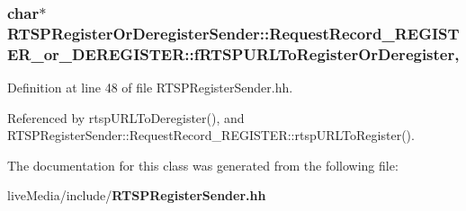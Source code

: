 \subsubsection[{f\+R\+T\+S\+P\+U\+R\+L\+To\+Register\+Or\+Deregister}]{\setlength{\rightskip}{0pt plus 5cm}char$\ast$ R\+T\+S\+P\+Register\+Or\+Deregister\+Sender\+::\+Request\+Record\+\_\+\+R\+E\+G\+I\+S\+T\+E\+R\+\_\+or\+\_\+\+D\+E\+R\+E\+G\+I\+S\+T\+E\+R\+::f\+R\+T\+S\+P\+U\+R\+L\+To\+Register\+Or\+Deregister\hspace{0.3cm}{\ttfamily [protected]}, {\ttfamily [inherited]}}\label{classRTSPRegisterOrDeregisterSender_1_1RequestRecord__REGISTER__or__DEREGISTER_a0f64ba313a2cc03bc1b9f4219ee992c8}


Definition at line 48 of file R\+T\+S\+P\+Register\+Sender.\+hh.



Referenced by rtsp\+U\+R\+L\+To\+Deregister(), and R\+T\+S\+P\+Register\+Sender\+::\+Request\+Record\+\_\+\+R\+E\+G\+I\+S\+T\+E\+R\+::rtsp\+U\+R\+L\+To\+Register().



The documentation for this class was generated from the following file\+:\begin{DoxyCompactItemize}
\item 
live\+Media/include/{\bf R\+T\+S\+P\+Register\+Sender.\+hh}\end{DoxyCompactItemize}
